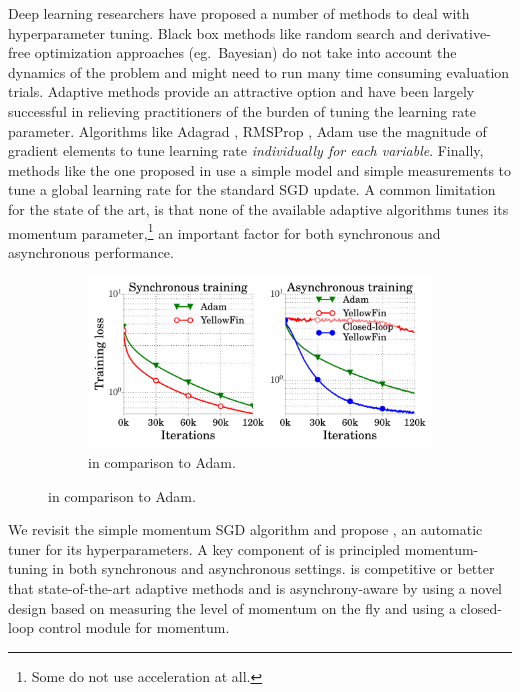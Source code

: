 Deep learning researchers have proposed a number of methods to deal with hyperparameter tuning. 
Black box methods like random search \cite{bergstra2012random} and
derivative-free optimization approaches (eg.\ Bayesian) \cite{snoek2012practical}
do not take into account the dynamics of the problem and might need to run many time consuming evaluation trials.
Adaptive methods provide an attractive option and have been largely successful in relieving practitioners of the burden of tuning the learning rate parameter. 
Algorithms like Adagrad \cite{duchi2011adaptive}, RMSProp \cite{tieleman2012lecture}, Adam \cite{kingma2014adam} use the magnitude of gradient elements to tune learning rate {\em individually for each variable}.
Finally, methods like the one proposed in \cite{schaul2013no} use a simple model and simple measurements to tune a global learning rate for the standard SGD update.
A common limitation for the state of the art, is that none of the available adaptive algorithms tunes its momentum parameter,\footnote{Some do not use acceleration at all.}
an important factor for both synchronous and asynchronous performance.


\begin{figure}
\vspace{-2em}
\begin{minipage}{1.0\linewidth}
\begin{figure}[H]
	\includegraphics[width=1.0\linewidth]{experiment_results/spotlight.pdf}
	\caption{\tuner in comparison to Adam.}
\end{figure}
\end{minipage}
\end{figure}
We revisit the simple momentum SGD algorithm and propose \tuner, an automatic tuner for its hyperparameters.
A key component of \tuner is principled momentum-tuning in both synchronous and asynchronous settings.
\tuner is competitive or better that state-of-the-art adaptive methods and is asynchrony-aware by using a novel design based on measuring the level of momentum on the fly and using a closed-loop control module for momentum.

